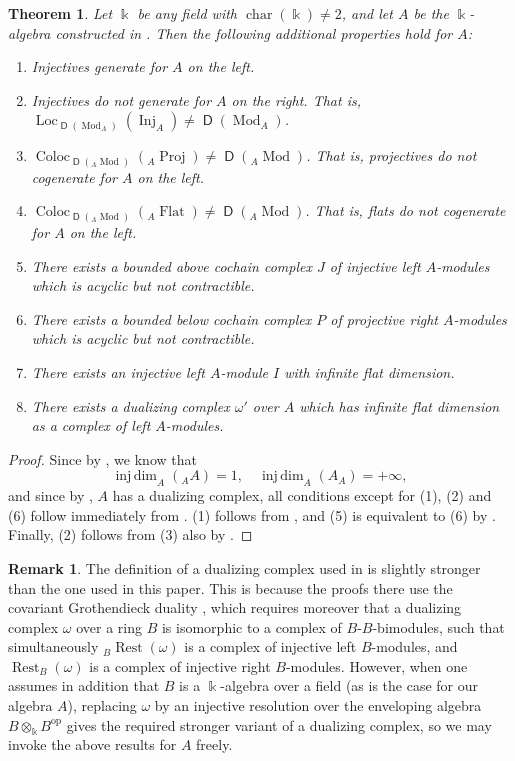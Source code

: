 \documentclass{amsart}
\newtheorem{thm}[equation]{Theorem}
\theoremstyle{definition}
\newtheorem{rem}[equation]{Remark}
\newcommand{\opn}{\operatorname}
\newcommand{\cat}[1]{\operatorname{\mathsf{#1}}}
\renewcommand{\k}{\Bbbk}
\newcommand{\injdim}{\operatorname{inj\,dim}}
\newcommand{\restlb}{{}_B \opn{Rest}}
\newcommand{\restrb}{\opn{Rest}_B}
\numberwithin{equation}{section}
\begin{document}
\begin{thm}\label{thm:failure}
Let $\k$ be any field with $\opn{char}(\k) \ne 2$,
and let $A$ be the $\k$-algebra constructed in .
Then the following additional properties hold for $A$:
\begin{enumerate}
\item Injectives generate for $A$ on the left.
\item Injectives do not generate for $A$ on the right.
That is, $\opn{Loc}_{\cat{D}(\opn{Mod}_A)}(\opn{Inj}_A) \ne \cat{D}(\opn{Mod}_A)$.
\item $\opn{Coloc}_{\cat{D}({}_A \opn{Mod})}({}_A \opn{Proj}) \ne \cat{D}({}_A \opn{Mod})$. 
That is, projectives do not cogenerate for $A$ on the left.
\item $\opn{Coloc}_{\cat{D}({}_A \opn{Mod})}({}_A \opn{Flat}) \ne \cat{D}({}_A \opn{Mod})$. 
That is, flats do not cogenerate for $A$ on the left.
\item There exists a bounded above cochain complex $J$ of injective left $A$-modules which is acyclic but not contractible.
\item There exists a bounded below cochain complex $P$ of projective right $A$-modules which is acyclic but not contractible.
\item There exists an injective left $A$-module $I$ with infinite flat dimension.
\item There exists a dualizing complex $\omega'$ over $A$ which has infinite flat dimension as a complex of left $A$-modules.
\end{enumerate}
\end{thm}
\begin{proof}
Since by , we know that 
\[
\injdim_A({}_A A) = 1, \quad \injdim_A(A_A) = +\infty,
\]
and since by , $A$ has a dualizing complex,
all conditions except for (1), (2) and (6) follow immediately from \cite[Theorem 6.3]{ShGor}.
(1) follows from \cite[Theorem 3.2]{Rickard},
and (5) is equivalent to (6) by \cite[Theorem 5.1]{ShGor}.
Finally, (2) follows from (3) also by \cite[Theorem 5.1]{ShGor}.
\end{proof}

\begin{rem}
The definition of a dualizing complex used in \cite{ShFinDim, ShGor} is slightly stronger than the one used in this paper. This is because the proofs there use the covariant Grothendieck duality \cite{InKr,Neeflat}, which requires moreover that a dualizing complex $\omega$ over a ring $B$ is isomorphic to a complex of $B$-$B$-bimodules, such that simultaneously 
$\restlb(\omega)$ is a complex of injective left $B$-modules,
and $\restrb(\omega)$ is a complex of injective right $B$-modules.
However, when one assumes in addition that $B$ is a $\k$-algebra over a field (as is the case for our algebra $A$), replacing $\omega$ by an injective resolution over the enveloping algebra $B\otimes_{\k} B^{\opn{op}}$ gives the required stronger variant of a dualizing complex,
so we may invoke the above results for $A$ freely.
\end{rem}
\end{document}
